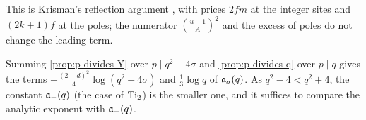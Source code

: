 This is Krisman's reflection argument \cite[Lemma~5.2]{Krisman2026chi2}, with prices $2fm$ at
the integer sites and $(2k+1)f$ at the poles; the numerator $\binom{u-1}A^2$ and the excess of
poles do not change the leading term.

\begin{remark}\label{rem:worse-sign}
Summing \cref{prop:p-divides-Y} over $p\mid q^2-4\sigma$ and \cref{prop:p-divides-q} over $p\mid
q$ gives the terms $-\frac{(2-d)^2}4\log(q^2-4\sigma)$ and $\frac13\log q$ of
$\mathfrak{a}_\sigma(q)$. As $q^2-4<q^2+4$, the constant $\mathfrak{a}_-(q)$ (the case of $\operatorname{Ti}_2$) is the
smaller one, and it suffices to compare the analytic exponent with $\mathfrak{a}_-(q)$.
\end{remark}
